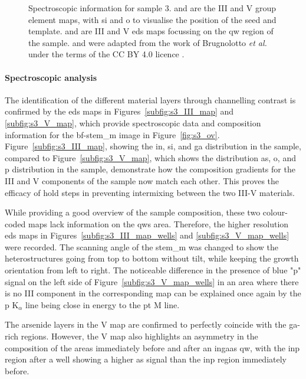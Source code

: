 \begin{figure}
{    }
    \caption[Spectroscopic analysis of sample 3.]{Spectroscopic information for sample 3.  and  are the III and V group element maps, with \acs{si} and \acs{o} to visualise the position of the seed and template.  and  are III and V \acs{eds} maps focussing on the \acl{qw} region of the sample.  and  were adapted from the work of Brugnolotto \textit{et al.} \cite{Brugnolotto2023} under the terms of the CC BY 4.0 licence \cite{CCBY40}.}
    \label{fig:s3_maps}
\end{figure}

\paragraph{Spectroscopic analysis} The identification of the different material layers through channelling contrast is confirmed by the \acs{eds} maps in Figures~\ref{subfig:s3_III_map} and \ref{subfig:s3_V_map}, which provide spectroscopic data and composition information for the \acs{bf}-\acs{stem_m} image in Figure~\ref{fig:s3_ov}. Figure~\ref{subfig:s3_III_map}, showing the \acl{in}, \acl{si}, and \acl{ga} distribution in the sample, compared to Figure~\ref{subfig:s3_V_map}, which shows the distribution \acl{as}, \acl{o}, and \acl{p} distribution in the sample, demonstrate how the composition gradients for the III and V components of the sample now match each other. This proves the efficacy of hold steps in preventing intermixing between the two III-V materials.

While providing a good overview of the sample composition, these two colour-coded maps lack information on the \acl{qw}s area. Therefore, the higher resolution \acs{eds} maps in Figures~\ref{subfig:s3_III_map_wells} and \ref{subfig:s3_V_map_wells} were recorded. The scanning angle of the \acs{stem_m} was changed to show the heterostructures going from top to bottom without tilt, while keeping the growth orientation from left to right. The noticeable difference in the presence of blue "\acl{p}" signal on the left side of Figure~\ref{subfig:s3_V_map_wells} in an area where there is no III component in the corresponding map can be explained once again by the \acl{p} K\(_\alpha\) line being close in energy to the \acl{pt} M line. 

The arsenide layers in the V map are confirmed to perfectly coincide with the \acs{ga}-rich regions. However, the V map also highlights an asymmetry in the composition of the areas immediately before and after an \acs{ingaas} \acs{qw}, with the \acs{inp} region after a well showing a higher \acl{as} signal than the \acs{inp} region immediately before.

